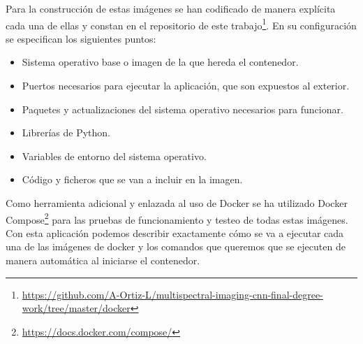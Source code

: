 Para la construcción de estas imágenes se han codificado de manera explícita cada una de ellas y constan en el repositorio de este trabajo\footnote{\url{https://github.com/A-Ortiz-L/multispectral-imaging-cnn-final-degree-work/tree/master/docker}}. En su configuración se especifican los siguientes puntos:
\begin{itemize}
    \item Sistema operativo base o imagen de la que hereda el contenedor.
    \item Puertos necesarios para ejecutar la aplicación, que son expuestos al exterior.
    \item Paquetes y actualizaciones del sistema operativo necesarios para funcionar.
    \item Librerías de Python.
    \item Variables de entorno del sistema operativo.
    \item Código y ficheros que se van a incluir en la imagen.
\end{itemize}

Como herramienta adicional y enlazada al uso de Docker se ha utilizado Docker Compose\footnote{\url{https://docs.docker.com/compose/}} para las pruebas de funcionamiento y testeo de todas estas imágenes.
Con esta aplicación podemos describir exactamente cómo se va a ejecutar cada una de las imágenes de docker y los comandos que queremos que se ejecuten de manera automática al iniciarse el contenedor.